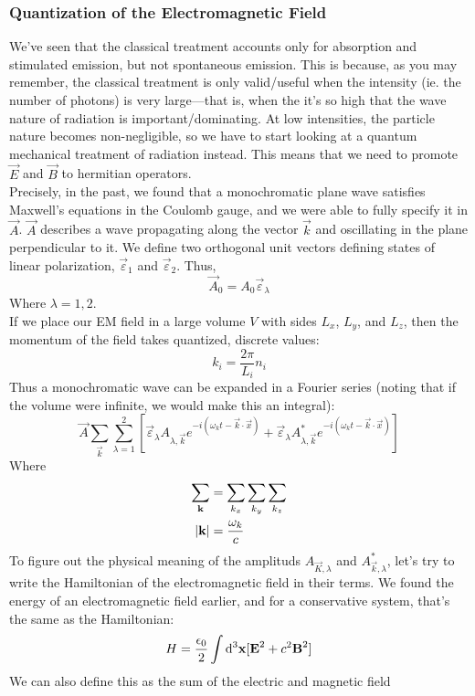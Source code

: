 \documentclass[a4paper]{article}
\begin{document}
\subsubsection{Quantization of the Electromagnetic Field}
We've seen that the classical treatment accounts only for absorption and
stimulated emission, but not spontaneous emission. This is because, as you
may remember, the classical treatment is only valid/useful when the intensity
(ie. the number of photons) is very large---that is, when the it's so high
that the wave nature of radiation is important/dominating. At low intensities,
the particle nature becomes non-negligible, so we have to start looking at
a quantum mechanical treatment of radiation instead. This means that we need
to promote $\vec{E}$ and $\vec{B}$ to hermitian operators.\\
Precisely, in the past, we found that a monochromatic plane wave satisfies
Maxwell's equations in the Coulomb gauge, and we were able to fully specify it
in $\vec{A}$. $\vec{A}$ describes a wave propagating along the vector
$\vec{k}$ and oscillating in the plane perpendicular to it. We define two
orthogonal unit vectors defining states of linear polarization,
$\vec{\varepsilon}_1$ and $\vec{\varepsilon}_2$. Thus,
\[
	\vec{A}_0 = A_0 \vec{\varepsilon}_\lambda
\]
Where $\lambda = 1,2$.\\
If we place our EM field in a large volume $V$ with sides $L_x$, $L_y$, and
$L_z$, then the momentum of the field takes quantized, discrete values:
\[
	k_i = \frac{2\pi}{L_i}n_i
\]
Thus a monochromatic wave can be expanded in a Fourier series (noting that
if the volume were infinite, we would make this an integral):
\[
	\vec{A} \sum_{\vec{k}} \sum_{\lambda=1}^2
	\left[
		\vec{\varepsilon}_\lambda A_{\lambda,\vec{k}}
			e^{-i(\omega_kt-\vec{k}\cdot\vec{x})} +
		\vec{\varepsilon}_\lambda A_{\lambda,\vec{k}}^\ast
			e^{-i(\omega_kt-\vec{k}\cdot\vec{x})}
	\right]
\]
Where
\begin{align*}
	\sum_{\boldsymbol{\mathbf{k}}} &= \sum_{k_x}\sum_{k_y}\sum_{k_z}\\
	\left\lvert \boldsymbol{\mathbf{k}}\right\rvert &= \frac{\omega_k}{c}
\end{align*}
To figure out the physical meaning of the amplituds $A_{\vec{K},\lambda}$ and
$A^\ast_{\vec{k},\lambda}$, let's try to write the Hamiltonian of the
electromagnetic field in their terms. We found the energy of an electromagnetic
field earlier, and for a conservative system, that's the same as the
Hamiltonian:
\[
	H = \frac{\epsilon_0}{2} \int \mathrm{d}^3\boldsymbol{\mathbf{x}} [\boldsymbol{\mathbf{E}}^2 + c^2\boldsymbol{\mathbf{B}}^2]
\]
We can also define this as the sum of the electric and magnetic field
\end{document}
